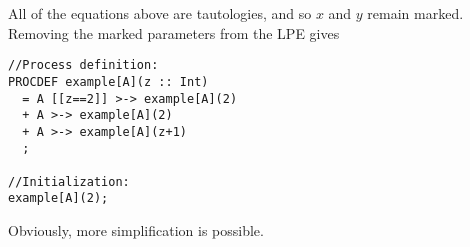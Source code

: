 All of the equations above are tautologies, and so $x$ and $y$ remain marked.
Removing the marked parameters from the LPE gives

\begin{lstlisting}
//Process definition:
PROCDEF example[A](z :: Int)
  = A [[z==2]] >-> example[A](2)
  + A >-> example[A](2)
  + A >-> example[A](z+1)
  ;

//Initialization:
example[A](2);
\end{lstlisting}

Obviously, more simplification is possible.

